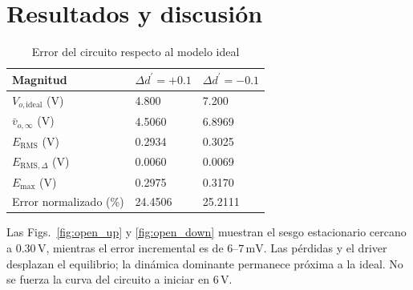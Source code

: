 \documentclass[conference,letterpaper]{IEEEtran}
\begin{document}
\section{Resultados y discusión}
\begin{table}[H]\caption{Error del circuito respecto al modelo ideal}\label{tab:open-errors}\centering\footnotesize\setlength{\tabcolsep}{2pt}\renewcommand{\arraystretch}{1.18}\begin{tabularx}{\columnwidth}{LYY}\toprule
Magnitud & $\Delta d^{\prime}=+0.1$ & $\Delta d^{\prime}=-0.1$\\\midrule
$V_{o,\mathrm{ideal}}$ (V) & 4.800 & 7.200\\
$\bar v_{o,\infty}$ (V) & 4.5060 & 6.8969\\
$E_{\mathrm{RMS}}$ (V) & 0.2934 & 0.3025\\
$E_{\mathrm{RMS},\Delta}$ (V) & 0.0060 & 0.0069\\
$E_{\max}$ (V) & 0.2975 & 0.3170\\
Error normalizado (\%) & 24.4506 & 25.2111\\\bottomrule\end{tabularx}\end{table}
Las Figs.~\ref{fig:open_up} y \ref{fig:open_down} muestran el sesgo estacionario cercano a $0.30\,\mathrm{V}$, mientras el error incremental es de 6--$7\,\mathrm{mV}$. Las pérdidas y el driver desplazan el equilibrio; la dinámica dominante permanece próxima a la ideal. No se fuerza la curva del circuito a iniciar en $6\,\mathrm{V}$.
\end{document}
